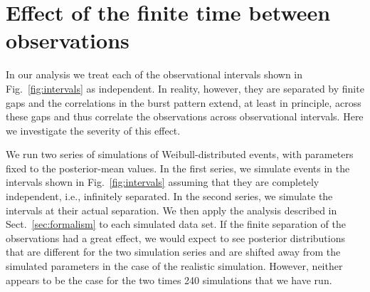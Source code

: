 \documentclass[fleqn,usenatbib]{mnras}
\begin{document}
\appendix
\section{Effect of the finite time between observations}
\label{sec:finiteness}

In our analysis we treat each of the observational intervals shown in Fig.~\ref{fig:intervals} as independent. In reality, however, they are separated by finite gaps and the correlations in the burst pattern extend, at least in principle, across these gaps and thus correlate the observations across observational intervals. Here we investigate the severity of this effect.

We run two series of simulations of Weibull-distributed events, with parameters fixed to the posterior-mean values. In the first series, we simulate events in the intervals shown in Fig.~\ref{fig:intervals} assuming that they are completely independent, i.e., infinitely separated. In the second series, we simulate the intervals at their actual separation. We then apply the analysis described in Sect.~\ref{sec:formalism} to each simulated data set. If the finite separation of the observations had a great effect, we would expect to see posterior distributions that are different for the two simulation series and are shifted away from the simulated parameters in the case of the realistic simulation. However, neither appears to be the case for the two times 240 simulations that we have run.
\end{document}
